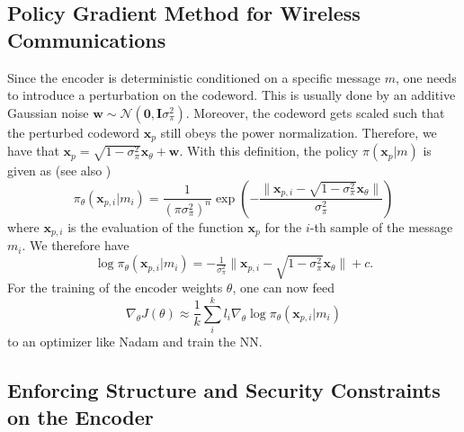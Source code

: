 \documentclass[conference, 10pt]{IEEEtran}
\begin{document}
\subsection{Policy Gradient Method for Wireless Communications}
Since the encoder is deterministic conditioned on a specific message $m$, one needs to introduce a perturbation on the codeword. This is usually done by an additive Gaussian noise $\mathbf{w}\sim \mathcal{N}(\mathbf{0},\mathbf{I}\sigma_{\pi}^2)$. Moreover, the codeword gets scaled such that the perturbed codeword $\mathbf{x}_p$ still obeys the power normalization. Therefore, we have that $\mathbf{x}_p= \sqrt{1-\sigma_{\pi}^2}\mathbf{x}_{\theta}+\mathbf{w}$. With this definition, the policy $\pi(\mathbf{x}_p|m)$ is given as (see also \cite{Aoudia-RL})
\begin{equation}
   \pi_{\theta}(\mathbf{x}_{p,i}|m_i) = \frac{1}{(\pi \sigma_{\pi}^2)^n}\exp \left(-\frac{\|\mathbf{x}_{p,i} - \sqrt{1-\sigma_{\pi}^2}\mathbf{x}_{\theta}\|}{\sigma_{\pi}^2} \right)
\end{equation} where $\mathbf{x}_{p,i}$ is the evaluation of the function $\mathbf{x}_p$ for the $i$-th sample of the message $m_i$. We therefore have 
\begin{equation}
  \log \pi_{\theta}(\mathbf{x}_{p,i}|m_i) = -\tfrac{1}{\sigma_{\pi}^2}\|\mathbf{x}_{p,i}-\sqrt{1-\sigma_{\pi}^2}\mathbf{x}_{\theta}\|+c.
\end{equation}
For the training of the encoder weights $\theta$, one can now feed 
\begin{equation}
    \nabla_{\theta}J(\theta)\approx \frac{1}{k}\sum_i^{k} l_i \nabla_{\theta}\log \pi_{\theta}(\mathbf{x}_{p,i}|m_i)
    \label{J_per_sample}
\end{equation} to an optimizer like Nadam\cite{Nadam} and train the NN.

\subsection{Enforcing Structure and Security Constraints on the Encoder}
\label{security_structure_rl}
\end{document}
